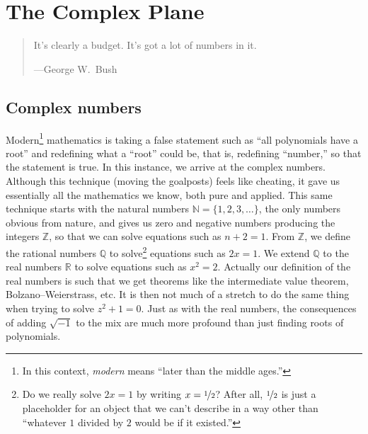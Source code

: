 \documentclass[12pt,openany]{book}
\newcommand{\R}{{\mathbb{R}}}
\newcommand{\Z}{{\mathbb{Z}}}
\newcommand{\N}{{\mathbb{N}}}
\newcommand{\Q}{{\mathbb{Q}}}
\newcommand{\myquote}[1]{``#1''}
\theoremstyle{plain}
\theoremstyle{remark}
\theoremstyle{definition}
\newenvironment{myepigraph}{%
    \begin{quote}%
    \begingroup\itshape
}{%
    \endgroup%
    \end{quote}
}
\theoremstyle{exercise}
\theoremstyle{example}
\begin{document}

\chapter{The Complex Plane} \label{ch:complexplane}

\begin{myepigraph}
It's clearly a budget. It's got a lot of numbers in it.

---George W.\ Bush
\end{myepigraph}


\section{Complex numbers} \label{sec:complexnums}

Modern\footnote{In this context, \emph{modern}
means \myquote{later than the middle ages.}}
mathematics
is taking a false statement such as
\myquote{all polynomials have a root} and redefining what a
\myquote{root} could be, that is,
redefining \myquote{number,}
so that the statement is true.
In this instance, we arrive at the complex numbers.
Although this technique (moving the goalposts)
feels like cheating, it gave us
essentially all the mathematics we know, both pure and applied.
This same
technique starts with the natural numbers
$\N = \{ 1,2,3,\ldots \}$, the only
numbers obvious from nature,
and gives us zero and negative numbers producing the integers
$\Z$, so that we can solve equations such as $n+2 = 1$.
From $\Z$, we define the rational numbers
$\Q$ to solve\footnote{%
Do we really solve $2x=1$ by writing $x = \nicefrac{1}{2}$?  After all, 
$\nicefrac{1}{2}$ is just a placeholder for an object that we can't describe
in a way other than
\myquote{whatever $1$ divided by $2$ would be if it existed.}}
equations such as $2x=1$.  We extend
$\Q$ to the real numbers $\R$
to solve equations such as $x^2=2$.  Actually our definition 
of the real numbers is such that we get theorems like the
intermediate value theorem, Bolzano--Weierstrass,
etc.  It is then not much of a stretch to do the same thing when trying
to solve $z^2+1=0$.  Just as with the real numbers,
the consequences of adding $\sqrt{-1}$ to the mix are much more
profound than just finding roots of polynomials.
\end{document}
